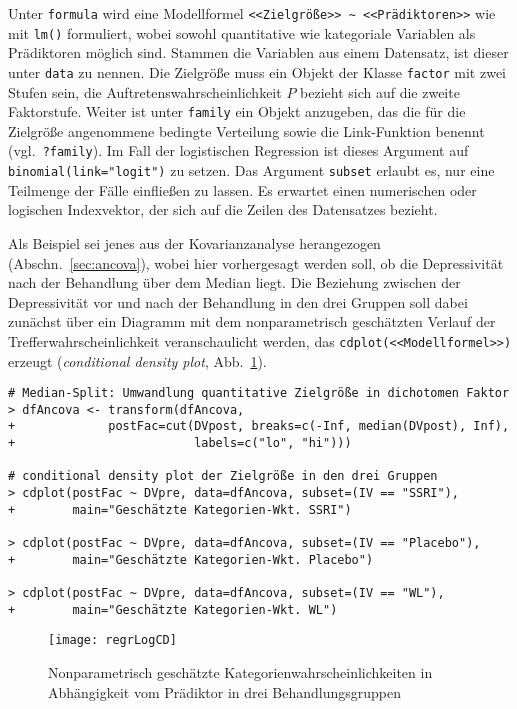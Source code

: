 Unter \lstinline!formula! wird eine Modellformel \lstinline!<<Zielgröße>> ~ <<Prädiktoren>>! wie mit \lstinline!lm()! formuliert, wobei sowohl quantitative wie kategoriale Variablen als Prädiktoren möglich sind. Stammen die Variablen aus einem Datensatz, ist dieser unter \lstinline!data! zu nennen. Die Zielgröße muss ein Objekt der Klasse \lstinline!factor! mit zwei Stufen sein, die Auftretenswahrscheinlichkeit $P$ bezieht sich auf die zweite Faktorstufe. Weiter ist unter \lstinline!family! ein Objekt anzugeben, das die für die Zielgröße angenommene bedingte Verteilung sowie die Link-Funktion benennt (vgl.\ \lstinline!?family!). Im Fall der logistischen Regression ist dieses Argument auf \lstinline!binomial(link="logit")! zu setzen. Das Argument \lstinline!subset! erlaubt es, nur eine Teilmenge der Fälle einfließen zu lassen. Es erwartet einen numerischen oder logischen Indexvektor, der sich auf die Zeilen des Datensatzes bezieht.

Als Beispiel sei jenes aus der Kovarianzanalyse herangezogen (Abschn.\ \ref{sec:ancova}), wobei hier vorhergesagt werden soll, ob die Depressivität nach der Behandlung über dem Median liegt. Die Beziehung zwischen der Depressivität vor und nach der Behandlung in den drei Gruppen soll dabei zunächst über ein Diagramm mit dem nonparametrisch geschätzten Verlauf der Trefferwahrscheinlichkeit veranschaulicht werden, das \lstinline!cdplot(<<Modellformel>>)! erzeugt (\emph{conditional density plot}, Abb.\ \ref{fig:regrLogCD}).
\begin{lstlisting}
# Median-Split: Umwandlung quantitative Zielgröße in dichotomen Faktor
> dfAncova <- transform(dfAncova,
+             postFac=cut(DVpost, breaks=c(-Inf, median(DVpost), Inf),
+                         labels=c("lo", "hi")))

# conditional density plot der Zielgröße in den drei Gruppen
> cdplot(postFac ~ DVpre, data=dfAncova, subset=(IV == "SSRI"),
+        main="Geschätzte Kategorien-Wkt. SSRI")

> cdplot(postFac ~ DVpre, data=dfAncova, subset=(IV == "Placebo"),
+        main="Geschätzte Kategorien-Wkt. Placebo")

> cdplot(postFac ~ DVpre, data=dfAncova, subset=(IV == "WL"),
+        main="Geschätzte Kategorien-Wkt. WL")
\end{lstlisting}

\begin{figure}[ht]
\centering
\texttt{[image: regrLogCD]}
\vspace*{-1em}
\caption{Nonparametrisch geschätzte Kategorienwahrscheinlichkeiten in Abhängigkeit vom Prädiktor in drei Behandlungsgruppen}
\label{fig:regrLogCD}
\end{figure}

